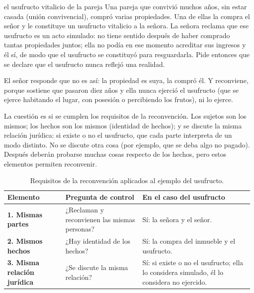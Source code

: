 \documentclass[12pt,oneside]{book}
\begin{document}
\begin{example}{el usufructo vitalicio de la pareja}
Una pareja que convivió muchos años, sin estar casada (unión convivencial), compró varias propiedades. Una de ellas la compra el señor y le constituye un usufructo vitalicio a la señora. La señora reclama que ese usufructo es un acto simulado: no tiene sentido después de haber comprado tantas propiedades juntos; ella no podía en ese momento acreditar sus ingresos y él sí, de modo que el usufructo se constituyó para resguardarla. Pide entonces que se declare que el usufructo nunca reflejó una realidad.

El señor responde que no es así: la propiedad es suya, la compró él. Y reconviene, porque sostiene que pasaron diez años y ella nunca ejerció el usufructo (que se ejerce habitando el lugar, con posesión o percibiendo los frutos), ni lo ejerce.

La cuestión es si se cumplen los requisitos de la reconvención. Los sujetos son los mismos; los hechos son los mismos (identidad de hechos); y se discute la misma relación jurídica: si existe o no el usufructo, que cada parte interpreta de un modo distinto. No se discute otra cosa (por ejemplo, que se deba algo no pagado). Después deberán probarse muchas cosas respecto de los hechos, pero estos elementos permiten reconvenir.
\end{example}

\begin{table}[H]
\centering
\small
\begin{tabularx}{\textwidth}{>{\raggedright\arraybackslash}p{} >{\raggedright\arraybackslash}X >{\raggedright\arraybackslash}X}
\toprule
\textbf{Elemento} & \textbf{Pregunta de control} & \textbf{En el caso del usufructo} \\
\midrule
\textbf{1. Mismas partes} & ¿Reclaman y reconvienen las mismas personas? & Sí: la señora y el señor. \\
\addlinespace
\textbf{2. Mismos hechos} & ¿Hay identidad de los hechos? & Sí: la compra del inmueble y el usufructo. \\
\addlinespace
\textbf{3. Misma relación jurídica} & ¿Se discute la misma relación? & Sí: si existe o no el usufructo; ella lo considera simulado, él lo considera no ejercido. \\
\bottomrule
\end{tabularx}
\caption{Requisitos de la reconvención aplicados al ejemplo del usufructo.}
\end{table}
\end{document}
